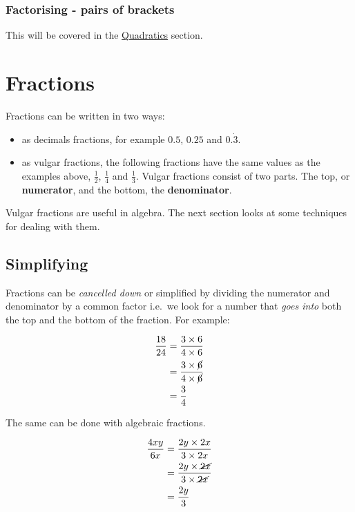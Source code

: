 \documentclass[
  a4paper,
]{scrbook}
\providecommand{\tightlist}{%
  \setlength{\itemsep}{0pt}\setlength{\parskip}{0pt}}
\begin{document}
\subsection{Factorising - pairs of
brackets}\label{factorising---pairs-of-brackets}

This will be covered in the \hyperref[quadratics]{Quadratics} section.


\chapter{Fractions}\label{fractions}

Fractions can be written in two ways:

\begin{itemize}
\tightlist
\item
  as decimals fractions, for example \(0.5\), \(0.25\) and
  \(0.\dot{3}\).
\item
  as vulgar fractions, the following fractions have the same values as
  the examples above, \(\frac{1}{2}\), \(\frac{1}{4}\) and
  \(\frac{1}{3}\). Vulgar fractions consist of two parts. The top, or
  \textbf{numerator}, and the bottom, the \textbf{denominator}.
\end{itemize}

Vulgar fractions are useful in algebra. The next section looks at some
techniques for dealing with them.

\section{Simplifying}\label{simplifying}

Fractions can be \emph{cancelled down} or simplified by dividing the
numerator and denominator by a common factor i.e.~we look for a number
that \emph{goes into} both the top and the bottom of the fraction. For
example:

\[
\begin{aligned} \frac{18}{24} &= \frac{3 \times 6}{4 \times 6} \\
&= \frac{3 \times \cancel{6}}{4 \times \cancel{6}} \\
&= \frac{3}{4}
\end{aligned}
\]

The same can be done with algebraic fractions.

\[
\begin{aligned} \frac{4xy}{6x} &= \frac{2y \times 2x}{3 \times 2x} \\
&= \frac{2y \times \cancel{2x}}{3 \times \cancel{2x}} \\
&= \frac{2y}{3}
\end{aligned}
\]
\end{document}
